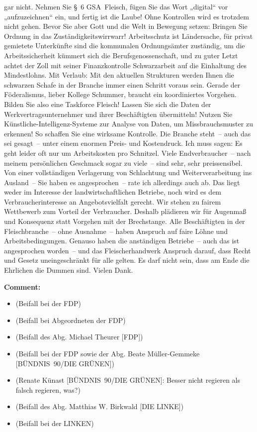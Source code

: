 \documentclass{article}
\begin{document}
gar nicht. Nehmen Sie § 6 GSA Fleisch, fügen Sie das Wort „digital“ vor „aufzuzeichnen“ ein, und fertig ist die Laube!  Ohne Kontrollen wird es trotzdem nicht gehen. Bevor Sie aber Gott und die Welt in Bewegung setzen: Bringen Sie Ordnung in das Zuständigkeitswirrwarr! Arbeitsschutz ist Ländersache, für privat gemietete Unterkünfte sind die kommunalen Ordnungsämter zuständig, um die Arbeitssicherheit kümmert sich die Berufsgenossenschaft, und zu guter Letzt achtet der Zoll mit seiner Finanzkontrolle Schwarzarbeit auf die Einhaltung des Mindestlohns.  Mit Verlaub: Mit den aktuellen Strukturen werden Ihnen die schwarzen Schafe in der Branche immer einen Schritt voraus sein. Gerade der Föderalismus, lieber Kollege Schummer, braucht ein koordiniertes Vorgehen. Bilden Sie also eine Taskforce Fleisch! Lassen Sie sich die Daten der Werkvertragsunternehmer und ihrer Beschäftigten übermitteln! Nutzen Sie Künstliche-Intelligenz-Systeme zur Analyse von Daten, um Missbrauchsmuster zu erkennen! So schaffen Sie eine wirksame Kontrolle.  Die Branche steht – auch das sei gesagt – unter einem enormen Preis- und Kostendruck. Ich muss sagen: Es geht leider oft nur um Arbeitskosten pro Schnitzel. Viele Endverbraucher – nach meinem persönlichen Geschmack sogar zu viele – sind sehr, sehr preissensibel. Von einer vollständigen Verlagerung von Schlachtung und Weiterverarbeitung ins Ausland – Sie haben es angesprochen – rate ich allerdings auch ab. Das liegt weder im Interesse der landwirtschaftlichen Betriebe, noch wird es dem Verbraucherinteresse an Angebotsvielfalt gerecht. Wir stehen zu fairem Wettbewerb zum Vorteil der Verbraucher. Deshalb plädieren wir für Augenmaß und Konsequenz statt Vorgehen mit der Brechstange. Alle Beschäftigten in der Fleischbranche – ohne Ausnahme – haben Anspruch auf faire Löhne und Arbeitsbedingungen. Genauso haben die anständigen Betriebe – auch das ist angesprochen worden – und das Fleischerhandwerk Anspruch darauf, dass Recht und Gesetz uneingeschränkt für alle gelten. Es darf nicht sein, dass am Ende die Ehrlichen die Dummen sind. Vielen Dank.  

\noindent\textbf{Comment:}
\begin{itemize}
    \setlength\itemsep{-3pt}
    \item (Beifall bei der FDP)
    \setlength\itemsep{-3pt}
    \item (Beifall bei Abgeordneten der FDP)
    \setlength\itemsep{-3pt}
    \item (Beifall des Abg. Michael Theurer [FDP])
    \setlength\itemsep{-3pt}
    \item (Beifall bei der FDP sowie der Abg. Beate Müller-Gemmeke [BÜNDNIS 90/DIE GRÜNEN])
    \setlength\itemsep{-3pt}
    \item (Renate Künast [BÜNDNIS 90/DIE GRÜNEN]: Besser nicht regieren als falsch regieren, was?)
    \setlength\itemsep{-3pt}
    \item (Beifall des Abg. Matthias W. Birkwald [DIE LINKE])
    \setlength\itemsep{-3pt}
    \item (Beifall bei der LINKEN)
\end{itemize}
\end{document}
